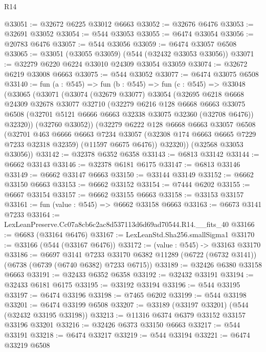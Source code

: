 \begin{lexlean}{R14}
\begin{coremodule}
@33051 := @32672 @6225 @33012 @6663
@33052 := @32676 @6476
@33053 := @32691 @33052
@33054 := @544 @33053
@33055 := @6474 @33054
@33056 := @20783 @6476
@33057 := @544 @33056
@33059 := @6474 @33057 @6508
@33065 := @33051 (@33055 @33059) (@544 (@32432 @33053 @33056))
@33071 := @32279 @6220 @6224 @33010 @24309 @33054 @33059
@33074 := @32672 @6219 @33008 @6663
@33075 := @544 @33052
@33077 := @6474 @33075 @6508
@33140 := fun (a : @545) =>
  fun (b : @545) =>
  fun (c : @545) =>
  @33048
    (@33065
      (@33071
        (@33074
          (@32679 @33077)
          @33054
          (@32695
            @6218
            @6668
            @24309
            @32678
            @33077
            @32710
            (@32279
              @6216
              @128
              @6668
              @6663
              @33075
              @6508
              (@32701 @5121 @6666 @6663 @32338 @33075 @32360 (@32708 @6476))
              @32320))
          (@32760 @33052))
        (@32279
          @6222
          @128
          @6668
          @6663
          @33057
          @6508
          (@32701
            @463
            @6666
            @6663
            @7234
            @33057
            (@32308 @174 @6663 @6665 @7229 @7233 @32318 @32359)
            (@11597 @6675 @6476))
          @32320))
      (@32568 @33053 @33056))
@33142 := @32378 @6352 @6358
@33143 := @6813 @33142
@33144 := @6662 @33143
@33146 := @32378 @6181 @6175
@33147 := @6813 @33146
@33149 := @6662 @33147 @6663
@33150 := @33144 @33149
@33152 := @6662 @33150 @6663
@33153 := @6662 @33152
@33154 := @7444 @6202
@33155 := @6667 @33154
@33157 := @6662 @33155 @6663
@33158 := @33153 @33157
@33161 := fun (value : @545) => @6662 @33158 @6663
@33163 := @6673 @3141 @7233
@33164 := LexLeanPreserve.Cc07a8cb6c2ac8d537113d6d69ad70544.R14.__fits_40
@33166 := @6683 (@33164 @6476)
@33167 := LexLeanStd.Sha256.smallSigma1
@33170 := @33166 (@544 (@33167 @6476))
@33172 := (value : @545) -> @33163 @33170
@33186 := @6697
    @3141
    @7233
    @33170
    @6382
    @11289
    (@6722 (@6732 @3141))
    (@6738 (@6739 (@6740 @6382) @7233 @6715))
@33189 := @32426 @6380 @33158 @6663
@33191 := @32433 @6352 @6358
@33192 := @32432 @33191
@33194 := @32433 @6181 @6175
@33195 := @33192 @33194
@33196 := @544 @33195
@33197 := @6474 @33196
@33198 := @7465 @6202
@33199 := @544 @33198
@33201 := @6474 @33199 @6508
@33207 := @33189 (@33197 @33201) (@544 (@32432 @33195 @33198))
@33213 := @11316 @6374 @6379 @33152 @33157 @33196 @33201
@33216 := @32426 @6373 @33150 @6663
@33217 := @544 @33191
@33218 := @6474 @33217
@33219 := @544 @33194
@33221 := @6474 @33219 @6508

\end{coremodule}
\end{lexlean}
